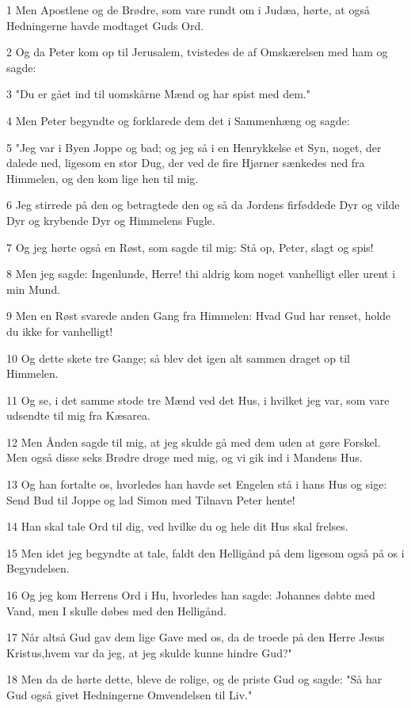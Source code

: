 \par 1 Men Apostlene og de Brødre, som vare rundt om i Judæa, hørte, at også Hedningerne havde modtaget Guds Ord.
\par 2 Og da Peter kom op til Jerusalem, tvistedes de af Omskærelsen med ham og sagde:
\par 3 "Du er gået ind til uomskårne Mænd og har spist med dem."
\par 4 Men Peter begyndte og forklarede dem det i Sammenhæng og sagde:
\par 5 "Jeg var i Byen Joppe og bad; og jeg så i en Henrykkelse et Syn, noget, der dalede ned, ligesom en stor Dug, der ved de fire Hjørner sænkedes ned fra Himmelen, og den kom lige hen til mig.
\par 6 Jeg stirrede på den og betragtede den og så da Jordens firføddede Dyr og vilde Dyr og krybende Dyr og Himmelens Fugle.
\par 7 Og jeg hørte også en Røst, som sagde til mig: Stå op, Peter, slagt og spis!
\par 8 Men jeg sagde: Ingenlunde, Herre! thi aldrig kom noget vanhelligt eller urent i min Mund.
\par 9 Men en Røst svarede anden Gang fra Himmelen: Hvad Gud har renset, holde du ikke for vanhelligt!
\par 10 Og dette skete tre Gange; så blev det igen alt sammen draget op til Himmelen.
\par 11 Og se, i det samme stode tre Mænd ved det Hus, i hvilket jeg var, som vare udsendte til mig fra Kæsarea.
\par 12 Men Ånden sagde til mig, at jeg skulde gå med dem uden at gøre Forskel. Men også disse seks Brødre droge med mig, og vi gik ind i Mandens Hus.
\par 13 Og han fortalte os, hvorledes han havde set Engelen stå i hans Hus og sige: Send Bud til Joppe og lad Simon med Tilnavn Peter hente!
\par 14 Han skal tale Ord til dig, ved hvilke du og hele dit Hus skal frelses.
\par 15 Men idet jeg begyndte at tale, faldt den Helligånd på dem ligesom også på os i Begyndelsen.
\par 16 Og jeg kom Herrens Ord i Hu, hvorledes han sagde: Johannes døbte med Vand, men I skulle døbes med den Helligånd.
\par 17 Når altså Gud gav dem lige Gave med os, da de troede på den Herre Jesus Kristus,hvem var da jeg, at jeg skulde kunne hindre Gud?"
\par 18 Men da de hørte dette, bleve de rolige, og de priste Gud og sagde: "Så har Gud også givet Hedningerne Omvendelsen til Liv."
